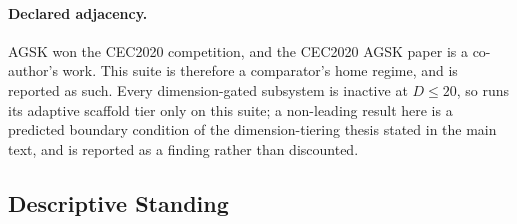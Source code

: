 \paragraph{Declared adjacency.}
AGSK won the CEC2020 competition, and the CEC2020 AGSK paper is a
co-author's work.  This suite is therefore a comparator's home regime, and
is reported as such.  Every dimension-gated \dtgsk{} subsystem is inactive
at $D \le 20$, so \dtgsk{} runs its adaptive scaffold tier only on this
suite; a non-leading result here is a predicted boundary condition of the
dimension-tiering thesis stated in the main text, and is reported as a
finding rather than discounted.

\subsection{Descriptive Standing}\label{sec:supp:cec2020:standing}

%
%
%
%

\begin{table}[htbp]
  \centering
  \caption{%
  }\label{tab:supp:cec2020:ranks}
\end{table}

